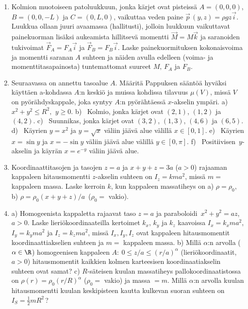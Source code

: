 \begin{enumerate}
\item 
Kolmion muotoiseen patoluukkuun, jonka kärjet ovat pisteissä $A=(0,0,0)$, $B=(0,0,-L)$ ja 
$C=(0,L,0)$, vaikuttaa veden paine $\vec p\,(y,z)=\rho g z \vec i$. Luukkua ollaan juuri 
avaamassa (hallitusti), jolloin luukkuun vaikuttavat painekuorman lisäksi aukeamista hillitsevä
momentti $\vec M=M\vec k$ ja saranoiden tukivoimat $\vec F_A = F_A \vec i$ ja
$\vec F_B=F_B\vec i$. Laske painekuormituksen kokonaisvoima ja momentti saranan $A$ suhteen ja
näiden avulla edelleen (voima- ja momenttitasapainosta) tuntemattomat suureet $M,\, F_A$ ja
$F_B$.

\item
Seuraavassa on annettu tasoalue $A$. Määritä Pappuksen sääntöä hyväksi käyttäen a-kohdassa
$A$:n keskiö ja muissa kohdissa tilavuus $\mu(V)$, missä $V$ on pyörähdyskappale, joka
syntyy $A$:n pyörähtäessä $x$-akselin ympäri. \vspace{1mm}\newline
a) \ $x^2+y^2 \le R^2,\,\ y \ge 0$. \newline
b) \ Kolmio, jonka kärjet ovat $(2,1)$, $(1,2)$ ja $(4,2)$. \newline
c) \ Suunnikas, jonka kärjet ovat $(3,2)$, $(1,3)$, $(4,6)$ ja $(6,5)$. \newline
d) \ Käyrien $y=x^2$ ja $y=\sqrt{x}$ väliin jäävä alue välillä $x\in[0,1]$. \newline 
e) \ Käyrien $x=\sin y$ ja $x=-\sin y$ väliin jäävä alue välillä $y\in[0,\pi]$. \newline
f) \ Positiivisen $\,y$-akselin ja käyrän $x=e^{-y}$ väliin jäävä alue.

\item
Koordinaattitasojen ja tasojen $z=a$ ja $x+y+z=3a$ ($a>0$) rajaaman kappaleen hitausmomentti
$z$-akselin suhteen on $I_z=kma^2$, missä $m=$ kappaleen massa. Laske kerroin $k$, kun
kappaleen massatiheys on a) $\rho=\rho_0$, b) $\rho=\rho_0(x+y+z)/a\,$ ($\rho_0=$ vakio).

\item
a) Homogeenista kappaletta rajaavat taso $z=a$ ja paraboloidi $\,x^2+y^2=az$, $a>0$. 
Laske lieriökoordinaateilla
kertoimet $k_x$, $k_y$ ja $k_z$ kaavoissa $I_x=k_xma^2$, $I_y=k_yma^2$ ja $I_z=k_zma^2$, missä
$I_x,I_y,I_z$ ovat kappaleen hitausmomentit koordinaattiakselien suhteen ja $m=$ kappaleen
massa. \vspace{1mm}\newline
b) Millä $\alpha$:n arvolla ($\alpha\in\R$) homogeenisen kappaleen 
$A:\ 0 \le z/a \le (r/a)^\alpha$ (lieriökoordinaatit, $a>0$) hitausmomentit kaikkien kolmen
karteesisen koordinaatiakselin suhteen ovat samat? \vspace{1mm}\newline
c) $R$-säteisen kuulan massatiheys pallokoordinaatistossa on $\rho(r)=\rho_0(r/R)^\alpha$
($\rho_0=$ vakio) ja massa $=m$. Millä $\alpha$:n arvolla kuulan hitausmomentti kuulan
keskipisteen kautta kulkevan suoran suhteen on $I_S=\frac{1}{2}mR^2$\,?


\end{enumerate}
